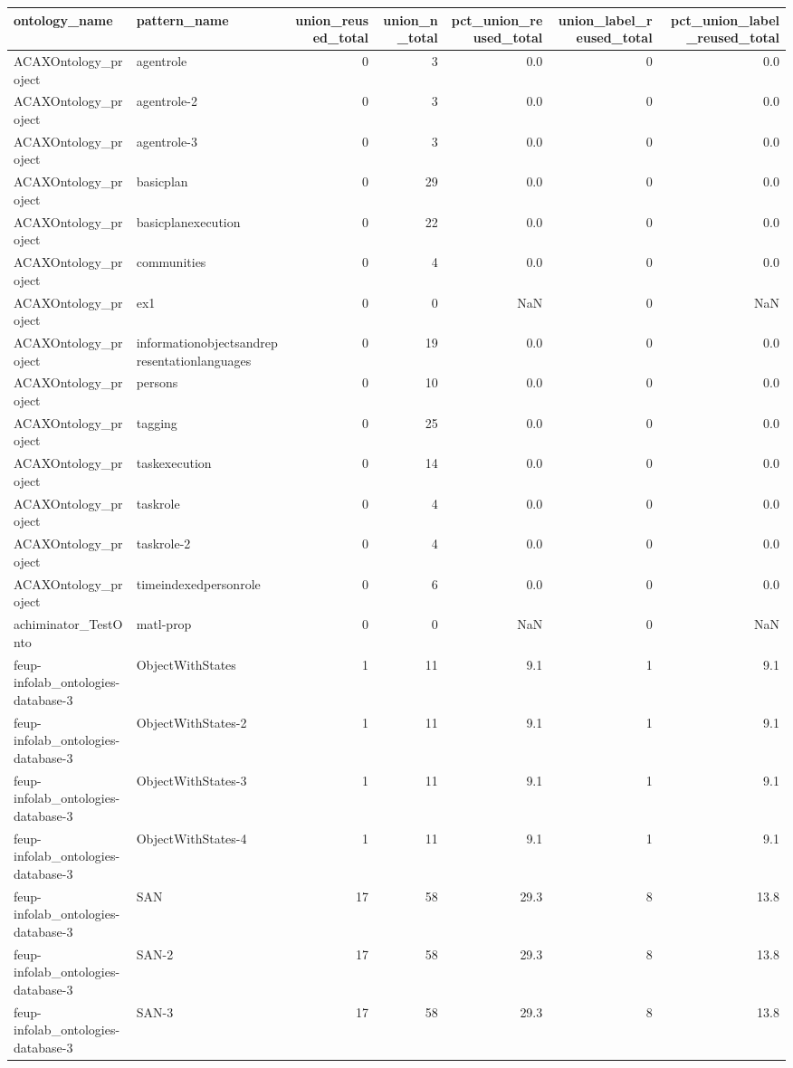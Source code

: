 \begin{tabular}{llrrrrr}
\toprule
ontology_name & pattern_name & union_reused_total & union_n_total & pct_union_reused_total & union_label_reused_total & pct_union_label_reused_total \\
\midrule
ACAXOntology_project & agentrole & 0 & 3 & 0.0 & 0 & 0.0 \\
ACAXOntology_project & agentrole-2 & 0 & 3 & 0.0 & 0 & 0.0 \\
ACAXOntology_project & agentrole-3 & 0 & 3 & 0.0 & 0 & 0.0 \\
ACAXOntology_project & basicplan & 0 & 29 & 0.0 & 0 & 0.0 \\
ACAXOntology_project & basicplanexecution & 0 & 22 & 0.0 & 0 & 0.0 \\
ACAXOntology_project & communities & 0 & 4 & 0.0 & 0 & 0.0 \\
ACAXOntology_project & ex1 & 0 & 0 & NaN & 0 & NaN \\
ACAXOntology_project & informationobjectsandrepresentationlanguages & 0 & 19 & 0.0 & 0 & 0.0 \\
ACAXOntology_project & persons & 0 & 10 & 0.0 & 0 & 0.0 \\
ACAXOntology_project & tagging & 0 & 25 & 0.0 & 0 & 0.0 \\
ACAXOntology_project & taskexecution & 0 & 14 & 0.0 & 0 & 0.0 \\
ACAXOntology_project & taskrole & 0 & 4 & 0.0 & 0 & 0.0 \\
ACAXOntology_project & taskrole-2 & 0 & 4 & 0.0 & 0 & 0.0 \\
ACAXOntology_project & timeindexedpersonrole & 0 & 6 & 0.0 & 0 & 0.0 \\
achiminator_TestOnto & matl-prop & 0 & 0 & NaN & 0 & NaN \\
feup-infolab_ontologies-database-3 & ObjectWithStates & 1 & 11 & 9.1 & 1 & 9.1 \\
feup-infolab_ontologies-database-3 & ObjectWithStates-2 & 1 & 11 & 9.1 & 1 & 9.1 \\
feup-infolab_ontologies-database-3 & ObjectWithStates-3 & 1 & 11 & 9.1 & 1 & 9.1 \\
feup-infolab_ontologies-database-3 & ObjectWithStates-4 & 1 & 11 & 9.1 & 1 & 9.1 \\
feup-infolab_ontologies-database-3 & SAN & 17 & 58 & 29.3 & 8 & 13.8 \\
feup-infolab_ontologies-database-3 & SAN-2 & 17 & 58 & 29.3 & 8 & 13.8 \\
feup-infolab_ontologies-database-3 & SAN-3 & 17 & 58 & 29.3 & 8 & 13.8 \\

\end{tabular}
